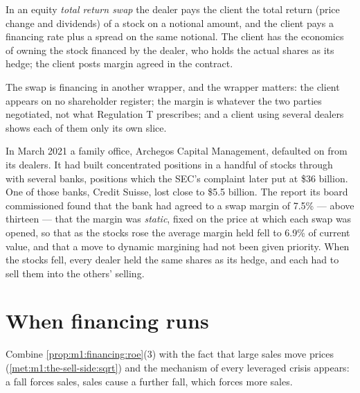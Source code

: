 \begin{definition}\label{def:m1:financing:trs}
In an equity \emph{total return swap} the dealer
pays the client the total return (price change and dividends) of a stock on
a notional amount, and the client pays a financing rate plus a spread on the
same notional. The client has the economics of owning the stock financed by
the dealer, who holds the actual shares as its hedge; the client posts
margin agreed in the contract.
\end{definition}

The swap is financing in another wrapper, and the wrapper matters: the
client appears on no shareholder register; the margin is whatever the two
parties negotiated, not what Regulation T prescribes; and a client using
several dealers shows each of them only its own slice.

\begin{example}[Archegos]\label{ex:m1:financing:archegos}
In March 2021 a family office, Archegos Capital Management, defaulted on
 from its dealers. It had built concentrated positions in a
handful of stocks through  with several banks, positions
which the SEC's complaint later put at \$36 billion. One of those banks,
Credit Suisse, lost close to \$5.5 billion. The report its board
commissioned found that the bank had agreed to a swap margin of 7.5\% ---
 above thirteen --- that the margin was \emph{static}, fixed on the
price at which each swap was opened, so that as the stocks rose the average
margin held fell to 6.9\% of current value, and that a move to dynamic
margining had not been given priority. When the stocks fell, every dealer
held the same shares as its hedge, and each had to sell them into the
others' selling.
\end{example}

\section{When financing runs}

Combine \cref{prop:m1:financing:roe}(3) with the fact that large sales move
prices (\cref{met:m1:the-sell-side:sqrt}) and the mechanism of every
leveraged crisis appears: a fall forces sales, sales cause a further fall,
which forces more sales.

